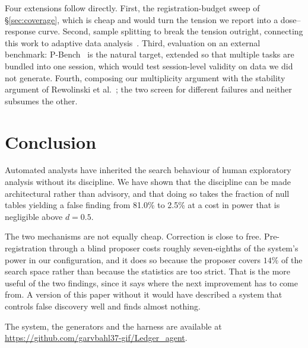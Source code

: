 \documentclass[10pt,twocolumn]{article}
\begin{document}
Four extensions follow directly. First, the registration-budget sweep of
\S\ref{sec:coverage}, which is cheap and would turn the tension we report into a
dose--response curve. Second, sample splitting to break the tension outright,
connecting this work to adaptive data analysis~\cite{dwork2015}. Third,
evaluation on an external benchmark: P-Bench~\cite{miao2026fisher} is the
natural target, extended so that multiple tasks are bundled into one session,
which would test session-level validity on data we did not generate. Fourth,
composing our multiplicity argument with the stability argument of Rewolinski et
al.~\cite{rewolinski2026sanity}; the two screen for different failures and
neither subsumes the other.

\section{Conclusion}

Automated analysts have inherited the search behaviour of human exploratory
analysis without its discipline. We have shown that the discipline can be made
architectural rather than advisory, and that doing so takes the fraction of null
tables yielding a false finding from 81.0\% to 2.5\% at a cost in power that is
negligible above $d = 0.5$.

The two mechanisms are not equally cheap. Correction is close to free.
Pre-registration through a blind proposer costs roughly seven-eighths of the
system's power in our configuration, and it does so because the proposer covers
$14\%$ of the search space rather than because the statistics are too strict.
That is the more useful of the two findings, since it says where the next
improvement has to come from. A version of this paper without it would have
described a system that controls false discovery well and finds almost
nothing.

The system, the generators and the harness are available at
\url{https://github.com/garvbahl37-gif/Ledger_agent}.
\end{document}
